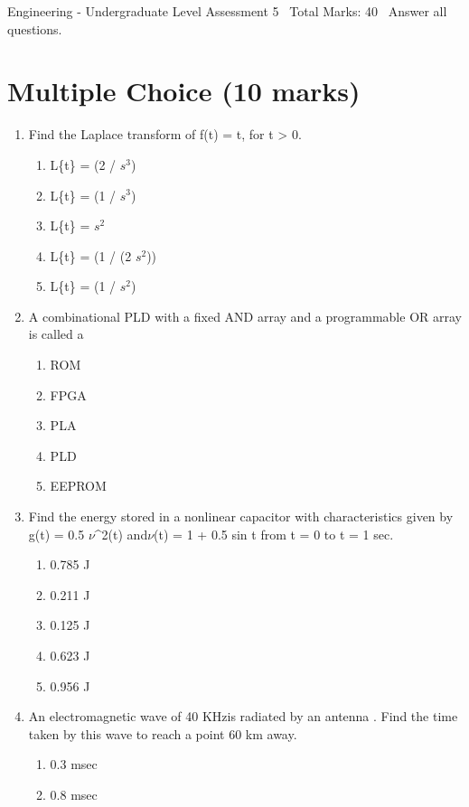 \documentclass[12pt]{article}
\begin{document}
\begin{center}
Engineering - Undergraduate Level Assessment 5 \
Total Marks: 40 \
Answer all questions.
\end{center}

\section*{Multiple Choice (10 marks)}
\begin{enumerate}[label=\arabic*.]
\item Find the Laplace transform of f(t) = t, for t \textgreater{} 0.
\begin{enumerate}[label=(\alph*)]
    \item L\{t\} = (2 / $s^3$)
    \item L\{t\} = (1 / $s^3$)
    \item L\{t\} = $s^2$
    \item L\{t\} = (1 / (2 $s^2$))
    \item L\{t\} = (1 / $s^2$)
\end{enumerate}
\item A combinational PLD with a fixed AND array and a programmable OR array is called a
\begin{enumerate}[label=(\alph*)]
    \item ROM
    \item FPGA
    \item PLA
    \item PLD
    \item EEPROM
\end{enumerate}
\item Find the energy stored in a nonlinear capacitor with characteristics given by g(t) = 0.5 \ensuremath{\nu}^2(t) and\ensuremath{\nu}(t) = 1 + 0.5 sin t from t = 0 to t = 1 sec.
\begin{enumerate}[label=(\alph*)]
    \item 0.785 J
    \item 0.211 J
    \item 0.125 J
    \item 0.623 J
    \item 0.956 J
\end{enumerate}
\item An electromagnetic wave of 40 KHzis radiated by an antenna . Find the time taken by this wave to reach a point 60 km away.
\begin{enumerate}[label=(\alph*)]
    \item 0.3 msec
    \item 0.8 msec

\end{enumerate}
\end{enumerate}
\end{document}
